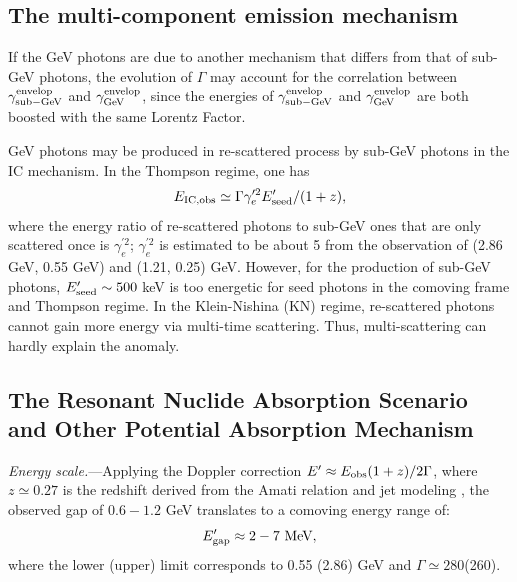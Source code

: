 \documentclass[linenumbers,twocolumn]{aastex631}
\begin{document}
 

\subsection{The multi-component emission mechanism}\label{sec: multi}
 If the GeV photons are due to another mechanism that differs from that of sub-GeV photons, the evolution of $\Gamma$ may account for the correlation between $\gamma^{\rm envelop}_{\rm sub-GeV}$ and $\gamma^{\rm envelop}_{\rm GeV}$, since the energies of $\gamma^{\rm envelop}_{\rm sub-GeV}$ and $\gamma^{\rm envelop}_{\rm GeV}$ are both boosted with the same Lorentz Factor. 

GeV photons may be produced in re-scattered process by sub-GeV photons in the IC mechanism. In the Thompson regime, one has
\begin{equation}
E_{\rm IC, obs}\simeq\Gamma\gamma'^{2}_e E'_{\rm seed}/(1+z),    
\end{equation}
 where the energy ratio of re-scattered photons to sub-GeV ones that are only scattered once is $\gamma_e^{'2}$; $\gamma_e^{'2}$ is estimated to be about 5 from the observation of (2.86 GeV, 0.55 GeV) and (1.21, 0.25) GeV. However, for the production of sub-GeV photons, $E'_{\rm seed }\sim 500$ keV is too energetic for seed photons in the comoving frame and Thompson regime. 
 In the Klein-Nishina (KN) regime, re-scattered photons cannot gain more energy via multi-time scattering. 
 Thus, multi-scattering can hardly explain the anomaly.

 



 
 


\subsection{The Resonant Nuclide Absorption Scenario and Other Potential Absorption Mechanism}
\label{sec:resonant-nuclide-absorption}\label{sec:absorption}

\textit{Energy scale.}---Applying the Doppler correction $E' \approx E_{\rm obs} (1+z) / 2\Gamma$, where $z \simeq 0.27$ is the redshift derived from the Amati relation and jet modeling \cite{2023MNRAS.522.5204B}, the observed gap of $0.6-1.2$ GeV translates to a comoving energy range of:
\begin{equation}
E_{\rm gap}^{\prime} \approx 2 - 7 \text{ MeV},
\end{equation}
where the lower (upper) limit corresponds to 0.55 (2.86) GeV and $\Gamma\simeq 280$(260). %
\end{document}
